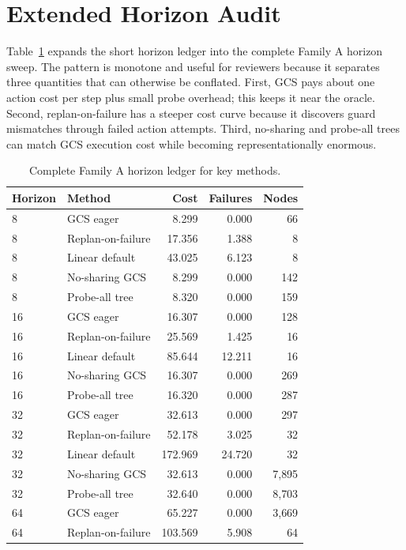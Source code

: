 \documentclass{article}
\begin{document}
\section{Extended Horizon Audit}
Table~\ref{tab:full-horizon-ledger} expands the short horizon ledger into the complete Family A horizon sweep. The pattern is monotone and useful for reviewers because it separates three quantities that can otherwise be conflated. First, GCS pays about one action cost per step plus small probe overhead; this keeps it near the oracle. Second, replan-on-failure has a steeper cost curve because it discovers guard mismatches through failed action attempts. Third, no-sharing and probe-all trees can match GCS execution cost while becoming representationally enormous.

\begin{table}[p]
\centering
\caption{Complete Family A horizon ledger for key methods.}
\label{tab:full-horizon-ledger}
\scriptsize
\begin{tabular}{llrrr}
\toprule
Horizon & Method & Cost & Failures & Nodes\\
\midrule
8 & GCS eager & 8.299 & 0.000 & 66\\
8 & Replan-on-failure & 17.356 & 1.388 & 8\\
8 & Linear default & 43.025 & 6.123 & 8\\
8 & No-sharing GCS & 8.299 & 0.000 & 142\\
8 & Probe-all tree & 8.320 & 0.000 & 159\\
\midrule
16 & GCS eager & 16.307 & 0.000 & 128\\
16 & Replan-on-failure & 25.569 & 1.425 & 16\\
16 & Linear default & 85.644 & 12.211 & 16\\
16 & No-sharing GCS & 16.307 & 0.000 & 269\\
16 & Probe-all tree & 16.320 & 0.000 & 287\\
\midrule
32 & GCS eager & 32.613 & 0.000 & 297\\
32 & Replan-on-failure & 52.178 & 3.025 & 32\\
32 & Linear default & 172.969 & 24.720 & 32\\
32 & No-sharing GCS & 32.613 & 0.000 & 7{,}895\\
32 & Probe-all tree & 32.640 & 0.000 & 8{,}703\\
\midrule
64 & GCS eager & 65.227 & 0.000 & 3{,}669\\
64 & Replan-on-failure & 103.569 & 5.908 & 64\\

\end{tabular}
\end{table}
\end{document}
